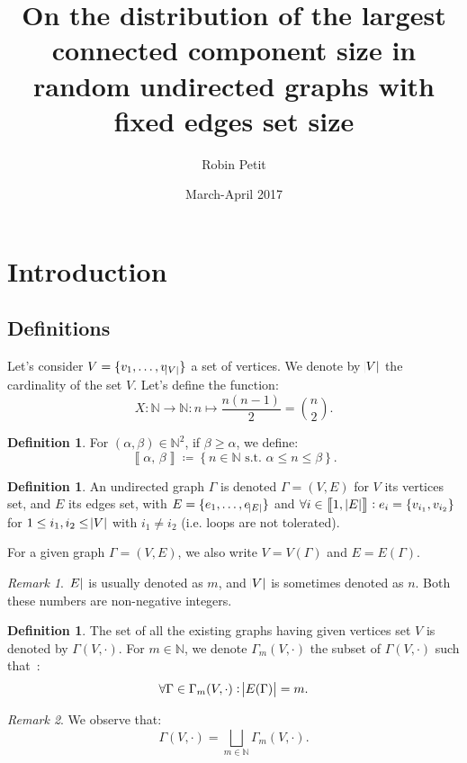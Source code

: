 \documentclass{article}
\author{Robin Petit}
\date{March-April 2017}
\title{On the distribution of the largest connected component size in random
undirected graphs with fixed edges set size}
\theoremstyle{definition}
\newtheorem{definition}[lemma]{Definition}
\theoremstyle{remark}
\newtheorem*{remark}{Remark}
\newcommand{\N}{\mathbb N}
\newcommand{\intint}[2]{\left\llbracket#1, \, #2\right\rrbracket}
\newcommand{\st}{\text{ s.t. }}
\begin{document}
\maketitle
\tableofcontents
\newpage
{}
\setcounter{page}{1}

\section{Introduction}
	\subsection{Definitions}
		Let's consider $V = \{v_1, \ldots, v_{\abs V}\}$ a set of vertices. We denote by $\abs V$ the cardinality of the set $V$. Let's define
		the function:
		\[X : \N \to \N : n \mapsto \frac {n(n-1)}2 = \binom n2.\]

		\begin{definition} For $(\alpha, \beta) \in \N^2$, if $\beta \geq \alpha$, we define:
		\[\intint \alpha\beta \coloneqq \left\{n \in \N \st \alpha \leq n \leq \beta\right\}.\]
		\end{definition}

		\begin{definition} An undirected graph $\Gamma$ is denoted $\Gamma = (V, E)$ for $V$ its vertices set, and $E$ its edges set, with $E = \{e_1, \ldots, e_{\abs E}\}$
		and $\forall i \in \intint 1{\abs E} : e_i = \{v_{i_1}, v_{i_2}\}$ for $1 \leq i_1, i_2 \leq \abs V$ with $i_1 \neq i_2$ (i.e. loops are not tolerated).

		For a given graph $\Gamma = (V, E)$, we also write $V = V(\Gamma)$ and $E = E(\Gamma)$.
		\end{definition}

		\begin{remark} $\abs E$ is usually denoted as $m$, and $\abs V$ is sometimes denoted as $n$. Both these numbers are non-negative integers.
		\end{remark}

		\begin{definition} The set of all the existing graphs having given vertices set $V$ is denoted by $\Gamma(V, \cdot)$. For $m \in \N$, we denote $\Gamma_m(V, \cdot)$
		the subset of $\Gamma(V, \cdot)$ such that~:
		\[\forall \Gamma \in \Gamma_m(V, \cdot) : \abs {E(\Gamma)} = m.\]
		\end{definition}

		\begin{remark} We observe that:
		\[\Gamma(V, \cdot) = \bigsqcup_{m \in \N}\Gamma_m(V, \cdot).\]
		\end{remark}
\end{document}
